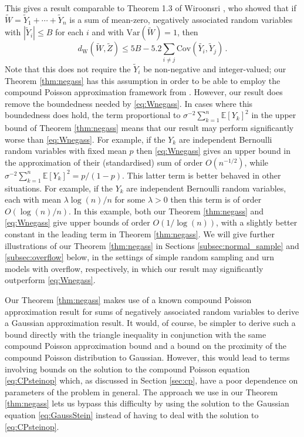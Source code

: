 \documentclass[12pt]{article}
\begin{document}
This gives a result comparable to Theorem 1.3 of Wiroonsri \cite{wiroonsri18}, who showed that if $\widetilde{W}=\widetilde{Y}_1+\cdots+\widetilde{Y}_n$ is a sum of mean-zero, negatively associated random variables with $|\widetilde{Y}_i|\leq B$ for each $i$ and with $\text{Var}(\widetilde{W})=1$, then
\begin{equation}\label{eq:Wnegass}
d_\text{W}(\widetilde{W},\widetilde{Z})\leq5B-5.2\sum_{i\not=j}\text{Cov}(\widetilde{Y_i},\widetilde{Y}_j)\,.
\end{equation}
Note that this does not require the $\widetilde{Y}_i$ be non-negative and integer-valued; our Theorem \ref{thm:negass} has this assumption in order to be able to employ the compound Poisson approximation framework from \cite{daly13}. However, our result does remove the boundedness needed by \eqref{eq:Wnegass}. In cases where this boundedness does hold, the term proportional to $\sigma^{-2}\sum_{k=1}^n\mathbb{E}[Y_k]^2$ in the upper bound of Theorem \ref{thm:negass} means that our result may perform significantly worse than \eqref{eq:Wnegass}. For example, if the $Y_k$ are independent Bernoulli random variables with fixed mean $p$ then \eqref{eq:Wnegass} gives an upper bound in the approximation of their (standardised) sum of order $O(n^{-1/2})$, while $\sigma^{-2}\sum_{k=1}^n\mathbb{E}[Y_k]^2=p/(1-p)$. This latter term is better behaved in other situations. For example, if the $Y_k$ are independent Bernoulli random variables, each with mean $\lambda\log(n)/n$ for some $\lambda>0$ then this term is of order $O(\log(n)/n)$. In this example, both our Theorem \ref{thm:negass} and \eqref{eq:Wnegass} give upper bounds of order $O(1/\log(n))$, with a slightly better constant in the leading term in Theorem \ref{thm:negass}. We will give further illustrations of our Theorem \ref{thm:negass} in Sections \ref{subsec:normal_sample} and \ref{subsec:overflow} below, in the settings of simple random sampling and urn models with overflow, respectively, in which our result may significantly outperform \eqref{eq:Wnegass}.   

Our Theorem \ref{thm:negass} makes use of a known compound Poisson approximation result for sums of negatively associated random variables to derive a Gaussian approximation result. It would, of course, be simpler to derive such a bound directly with the triangle inequality in conjunction with the same compound Poisson approximation bound and a bound on the proximity of the compound Poisson distribution to Gaussian. However, this would lead to terms involving bounds on the solution to the compound Poisson equation \eqref{eq:CPsteinop} which, as discussed in Section \ref{sec:cp}, have a poor dependence on parameters of the problem in general. The approach we use in our Theorem \ref{thm:negass} lets us bypass this difficulty by using the solution to the Gaussian equation \eqref{eq:GaussStein} instead of having to deal with the solution to \eqref{eq:CPsteinop}.
\end{document}
